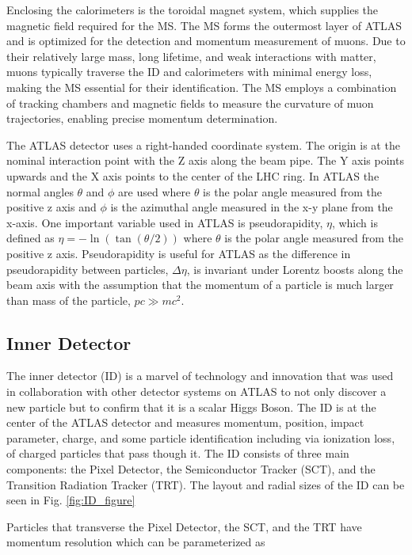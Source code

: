 Enclosing the calorimeters is the toroidal magnet system, which supplies the magnetic field required for the MS. 
The MS forms the outermost layer of ATLAS and is optimized for the detection and momentum measurement of muons. 
Due to their relatively large mass, long lifetime, and weak interactions with matter, muons typically traverse the ID and calorimeters with minimal energy loss, making the MS essential for their identification. 
The MS employs a combination of tracking chambers and magnetic fields to measure the curvature of muon trajectories, enabling precise momentum determination.




The ATLAS detector uses a right-handed coordinate system. 
The origin is at the nominal interaction point with the Z axis along the beam pipe. 
The Y axis points upwards and the X axis points to the center of the LHC ring.
In ATLAS the normal angles $\theta$ and $\phi$ are used where $\theta$ is the polar angle measured from the positive z axis and $\phi$ is the azimuthal angle measured in the x-y plane from the x-axis.
One important variable used in ATLAS is pseudorapidity, $\eta$, which is defined as $\eta = -\ln(\tan(\theta/2))$ where $\theta$ is the polar angle measured from the positive z axis.
Pseudorapidity is useful for ATLAS as the difference in pseudorapidity between particles, $\Delta \eta$, is invariant under Lorentz boosts along the beam axis with the assumption that the momentum of a particle is much larger than mass of the particle, $pc\gg mc^2$.





\subsection{Inner Detector}

The inner detector (ID) is a marvel of technology and innovation that was used in collaboration
with other detector systems on ATLAS to not only discover a new particle but to confirm that it is
a scalar Higgs Boson. The ID is at the center of the ATLAS detector and measures momentum,
position, impact parameter, charge, and some particle identification including via ionization loss,
of charged particles that pass though it.
The ID consists of three main components: the Pixel Detector, the Semiconductor Tracker (SCT), and the Transition Radiation Tracker (TRT). The layout and radial sizes of the ID can be seen in Fig. \ref{fig:ID_figure}

Particles that transverse the Pixel Detector, the SCT, and the TRT have momentum resolution which can be parameterized as


